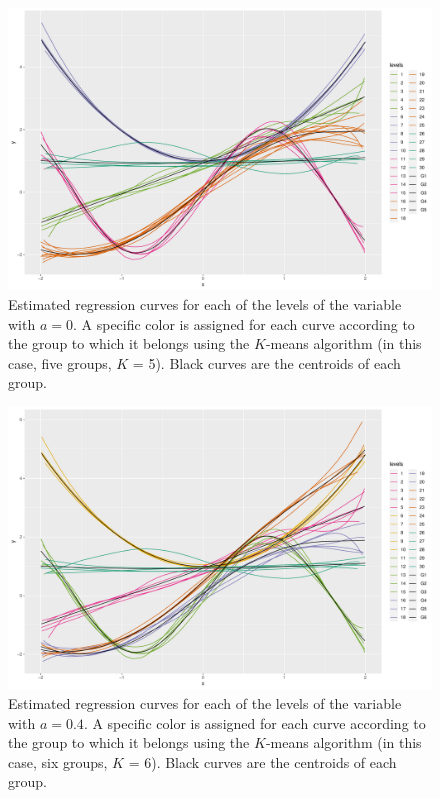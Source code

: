 \begin{figure}[htbp]
\includegraphics[width = 14cm]{sim_5kmeans.pdf}
\caption{\label{noramv:sim_5kmeans}
Estimated regression curves for each of the levels of the variable  with $a=0$. A specific color is assigned for each curve according to the group to which it belongs using the $K$-means algorithm (in this case, five groups, $K$ = 5). Black curves are the centroids of each group.}
\end{figure}


\begin{figure}[htbp]
\includegraphics[width = 14cm]{sim_6kmeans.pdf}
\caption{\label{noramv:sim_6kmeans}
 Estimated regression curves for each of the levels of the variable  with $a=0.4$. A specific color is assigned for each curve according to the group to which it belongs using the $K$-means algorithm (in this case, six groups, $K$ = 6). Black curves are the centroids of each group.}
\end{figure}


